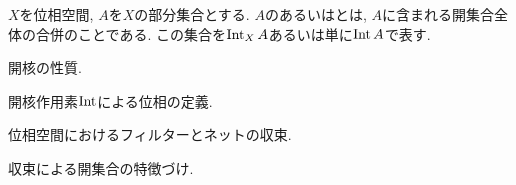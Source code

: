 \documentclass[uplatex, dvipdfmx, a4paper, 12pt, class=jsbook, crop=false]{standalone}
\begin{document}
\begin{definition}
	$X$を位相空間, $A$を$X$の部分集合とする.
	$A$のあるいはとは, $A$に含まれる開集合全体の合併のことである.
	この集合を$\mathop{\mathrm{Int}}\nolimits_X A$あるいは単に$\mathop{\mathrm{Int}}\nolimits A$で表す.
\end{definition}

\begin{proposition}
	\WIP
	開核の性質.
\end{proposition}

\begin{proposition}
	\WIP
	開核作用素$\mathop{\mathrm{Int}}\nolimits$による位相の定義.
\end{proposition}

\begin{definition}
	\WIP
	位相空間におけるフィルターとネットの収束.
\end{definition}

\begin{proposition}
	\WIP
	収束による開集合の特徴づけ.
\end{proposition}
\end{document}
